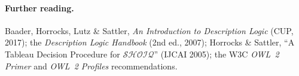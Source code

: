 \documentclass[11pt]{article}
\theoremstyle{definition}
\begin{document}
\paragraph{Further reading.} Baader, Horrocks, Lutz \& Sattler, \emph{An
Introduction to Description Logic} (CUP, 2017); the \emph{Description Logic
Handbook} (2nd ed., 2007); Horrocks \& Sattler, ``A Tableau Decision Procedure
for $\mathcal{SHOIQ}$'' (IJCAI 2005); the W3C \emph{OWL~2 Primer} and
\emph{OWL~2 Profiles} recommendations.
\end{document}
